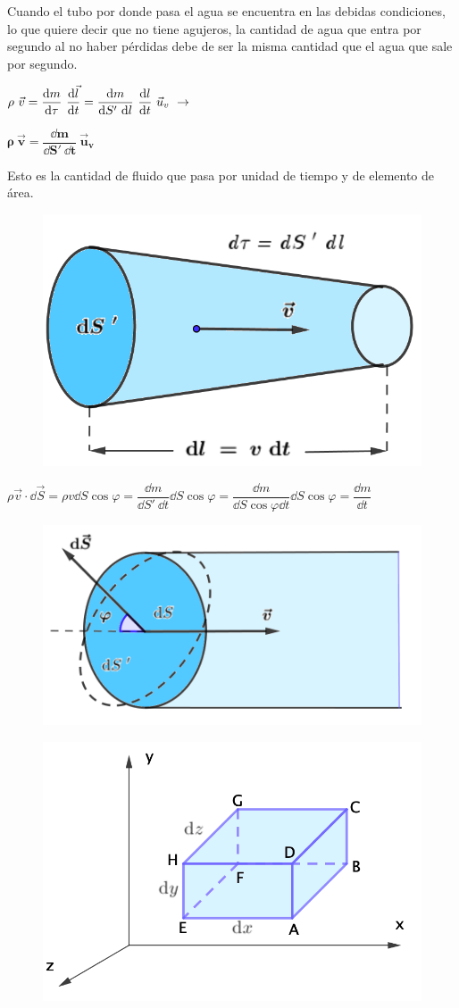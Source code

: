 \textcolor{gris}{Cuando el tubo por donde pasa el agua se encuentra en las debidas condiciones, lo que quiere decir que no tiene agujeros, la cantidad de agua que entra por segundo al no haber pérdidas debe de ser la misma cantidad que el agua que sale por segundo.}

\begin{multicols}{2}
$\displaystyle \rho \ \vec v=\dfrac {\dd m}{\dd \tau} \ \dv{\vec l}{t}= \dfrac {\dd m}{\dd S' \ \dd l} \ \dv{l}{t} \ \vec u_v \ \to $ 

$\boldsymbol{\rho \ \vec v = \dfrac{\dd m}{\dd S' \ \dd t} \ \vec u_v}$

Esto es la cantidad de fluido que pasa por unidad de tiempo y de elemento de área.

\begin{figure}[H]
	\centering
	\includegraphics[width=.4\textwidth]{imagenes/imagenes18/T18IM03.png}
	\end{figure}
\end{multicols}

$\rho \vec v \cdot  \dd \vec S=\rho v \dd S \cos \varphi=\dfrac {\dd m}{\dd S'\ \dd t} \dd S \cos \varphi=\dfrac{\dd m}{\dd S \cos \varphi \dd t}\dd S \cos \varphi=\dfrac {\dd m}{\dd t}$
\begin{multicols}{2}
\begin{figure}[H]
	\centering
	\includegraphics[width=.4\textwidth]{imagenes/imagenes18/T18IM04.png}
	\end{figure}
	\begin{figure}[H]
	\centering
	\includegraphics[width=.4\textwidth]{imagenes/imagenes18/T18IM05.png}
	\end{figure}
\end{multicols}






